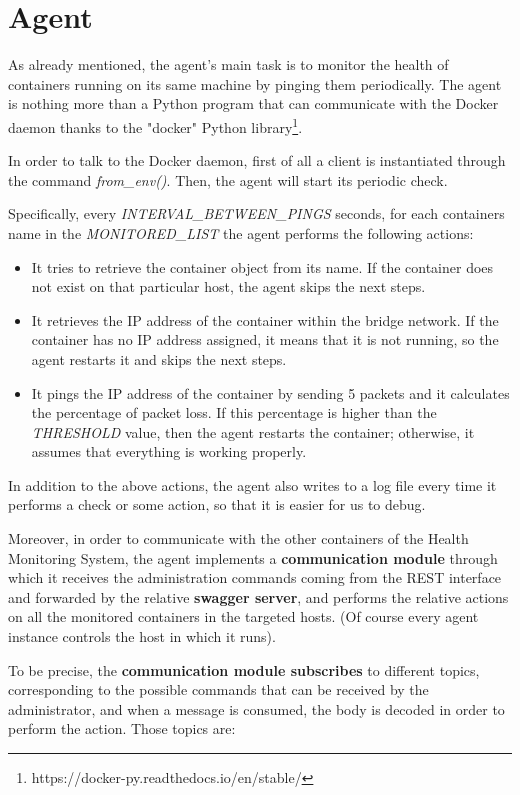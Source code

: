 \section{Agent}
As already mentioned, the agent’s main task is to monitor the health of containers running on its same machine by pinging them periodically. The agent is nothing more than a Python program that can communicate with the Docker daemon thanks to the "docker" Python library\footnote{https://docker-py.readthedocs.io/en/stable/ }.

\noindent In order to talk to the Docker daemon, first of all a client is instantiated through the command \textit{from\_env()}. Then, the agent will start its periodic check.

\noindent Specifically, every \textit{INTERVAL\_BETWEEN\_PINGS} seconds, for each containers name in the \textit{MONITORED\_LIST} the agent performs the following actions:

\begin{itemize}
	\item It tries to retrieve the container object from its name. If the container does not exist on that particular host, the agent skips the next steps.
	\item It retrieves the IP address of the container within the bridge network. If the container has no IP address assigned, it means that it is not running, so the agent restarts it and skips the next steps.
	\item It pings the IP address of the container by sending 5 packets and it calculates the percentage of packet loss. If this percentage is higher than the \textit{THRESHOLD} value, then the agent restarts the container; otherwise, it assumes that everything is working properly.
\end{itemize}
In addition to the above actions, the agent also writes to a log file every time it performs a check or some action, so that it is easier for us to debug.

\noindent Moreover, in order to communicate with the other containers of the Health Monitoring System, the agent implements a \textbf{communication module} through which it receives the administration commands coming from the REST interface and forwarded by the relative \textbf{swagger server}, and performs the relative actions on all the monitored containers in the targeted hosts. (Of course every agent instance controls the host in which it runs).

\noindent To be precise, the \textbf{communication module subscribes} to different topics, corresponding to the possible commands that can be received by the administrator, and when a message is consumed, the body is decoded in order to perform the action. Those topics are:

